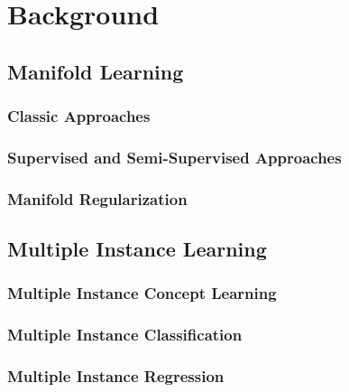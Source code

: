 \chapter{Background}

\section{Manifold Learning}

\subsection{Classic Approaches}

%

\subsection{Supervised and Semi-Supervised Approaches}

\subsection{Manifold Regularization}


\section{Multiple Instance Learning}

\subsection{Multiple Instance Concept Learning}

\subsection{Multiple Instance Classification}

\subsection{Multiple Instance Regression}


